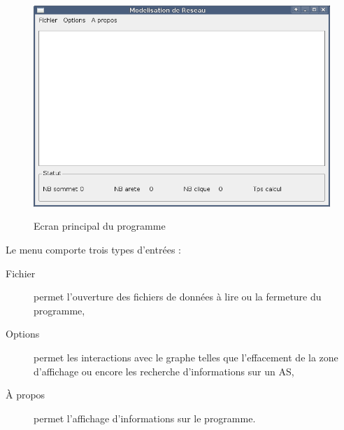 \begin{figure}[H]
\centering
 \fbox
 {
 \includegraphics[width=16cm]{./schema/capture_ecran_programme.png}
 }
  \caption{\label{ecran_principal}Ecran principal du programme}
\end{figure}


Le menu comporte trois types d'entr\'ees :
\begin{description}
 \item[Fichier] permet l'ouverture des fichiers de donn\'ees \`a lire ou la fermeture du programme,
 \item[Options] permet les interactions avec le graphe telles que l'effacement de la zone d'affichage ou encore les recherche d'informations sur un AS,
 \item[\`A propos] permet l'affichage d'informations sur le programme.
\end{description}

